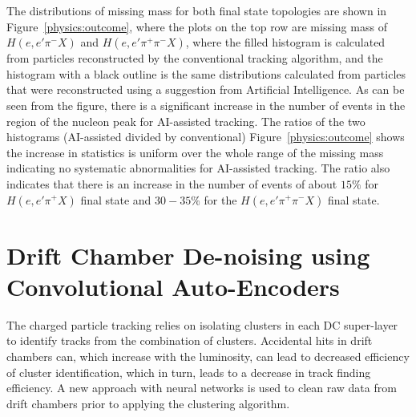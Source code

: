 \documentclass{webofc}
\begin{document}
The distributions of missing mass for both final state topologies are shown in Figure~\ref{physics:outcome}, where the plots 
on the top row are missing mass of $H(e,e'\pi^-X)$ and $H(e,e'\pi^+\pi^-X)$, where the filled histogram is calculated from 
particles reconstructed by the conventional tracking algorithm, and the histogram with a black outline is the same distributions 
calculated from particles that were reconstructed using a suggestion from Artificial Intelligence. As can be seen from the figure, 
there is a significant increase in the number of events in the region of the nucleon peak for AI-assisted
tracking. The ratios of the two histograms (AI-assisted divided by conventional)
Figure~\ref{physics:outcome} shows the increase in statistics is uniform over the whole range of the 
missing mass indicating no systematic abnormalities for AI-assisted tracking. The ratio also indicates that there is an increase 
in the number of events of about $15\%$ for $H(e,e'\pi^+X)$ final state and $30-35\%$ for the $H(e,e'\pi^+\pi^-X)$
final state. 

\section{Drift Chamber De-noising using Convolutional Auto-Encoders}
\label{dc-denoising}

The charged particle tracking relies on isolating clusters in each DC super-layer to identify tracks from the combination of clusters.
Accidental hits in drift chambers can, which increase with the luminosity, can lead to decreased efficiency of cluster identification, which 
in turn, leads to a decrease in track finding efficiency. A new approach with neural networks is used to clean raw data from drift chambers 
prior to applying the clustering algorithm. 
\end{document}
